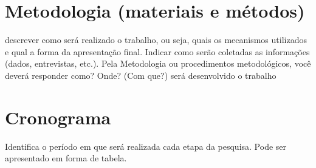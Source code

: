 \documentclass[a4paper,11pt]{article}
\begin{document}
\section{Metodologia (materiais e métodos)}  
descrever como será realizado o trabalho, ou seja, quais os mecanismos utilizados e qual a forma da apresentação final.  Indicar como serão coletadas as informações (dados, entrevistas, etc.). Pela Metodologia ou procedimentos metodológicos, você deverá responder como? Onde? (Com que?) será desenvolvido o trabalho

\section{Cronograma}  
Identifica o período em que será realizada cada etapa da pesquisa. Pode ser apresentado em forma de tabela.




\end{document}

